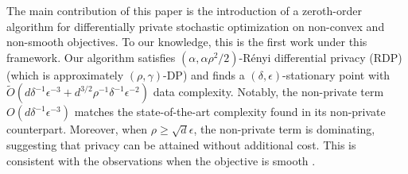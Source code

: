 The main contribution of this paper is the introduction of a zeroth-order algorithm for differentially private stochastic optimization on non-convex and non-smooth objectives. 
To our knowledge, this is the first work under this framework.
Our algorithm satisfies $(\alpha,\alpha\rho^2/2)$-R\'enyi differential privacy (RDP) \citep{mironov2017renyi} (which is approximately $(\rho,\gamma)$-DP) 
and finds a $(\delta,\epsilon)$-stationary point with 
$\tilde O(d\delta^{-1}\epsilon^{-3} + d^{3/2}\rho^{-1}\delta^{-1}\epsilon^{-2})$
data complexity. 
Notably, the non-private term $O(d\delta^{-1}\epsilon^{-3})$ matches the state-of-the-art complexity found in its non-private counterpart. Moreover, when $\rho \ge \sqrt{d}\epsilon$, the non-private term is dominating, suggesting that privacy can be attained without additional cost. This is consistent with the observations when the objective is smooth \citep{arora2023faster}.


